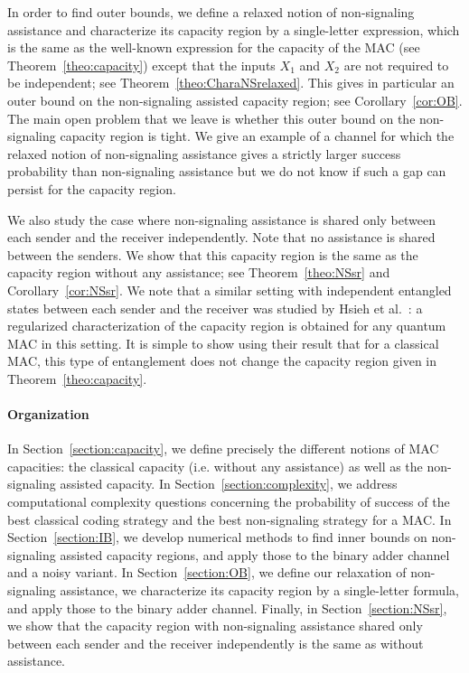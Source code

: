 In order to find outer bounds, we define a relaxed notion of non-signaling assistance and characterize its capacity region by a single-letter expression, which is the same as the well-known expression for the capacity of the MAC (see Theorem~\ref{theo:capacity}) except that the inputs $X_1$ and $X_2$ are not required to be independent; see Theorem~\ref{theo:CharaNSrelaxed}. This gives in particular an outer bound on the non-signaling assisted capacity region; see Corollary~\ref{cor:OB}. The main open problem that we leave is whether this outer bound on the non-signaling capacity region is tight. We give an example of a channel for which the relaxed notion of non-signaling assistance gives a strictly larger success probability than non-signaling assistance but we do not know if such a gap can persist for the capacity region.

We also study the case where non-signaling assistance is shared only between each sender and the receiver independently. Note that no assistance is shared between the senders. We show that this capacity region is the same as the capacity region without any assistance; see Theorem~\ref{theo:NSsr} and Corollary~\ref{cor:NSsr}. We note that a similar setting with independent entangled states between each sender and the receiver was studied by Hsieh et al.~\cite{HDW08}: a regularized characterization of the capacity region is obtained for any quantum MAC in this setting. It is simple to show using their result that for a classical MAC, this type of entanglement does not change the capacity region given in Theorem~\ref{theo:capacity}.

\paragraph{Organization} In Section~\ref{section:capacity}, we define precisely the different notions of MAC capacities: the classical capacity (i.e. without any assistance) as well as the non-signaling assisted capacity. In Section~\ref{section:complexity}, we address computational complexity questions concerning the probability of success of the best classical coding strategy and the best non-signaling strategy for a MAC. In Section~\ref{section:IB}, we develop numerical methods to find inner bounds on non-signaling assisted capacity regions, and apply those to the binary adder channel and a noisy variant. In Section~\ref{section:OB}, we define our relaxation of non-signaling assistance, we characterize its capacity region by a single-letter formula, and apply those to the binary adder channel. Finally, in Section~\ref{section:NSsr}, we show that the capacity region with non-signaling assistance shared only between each sender and the receiver independently is the same as without assistance.


